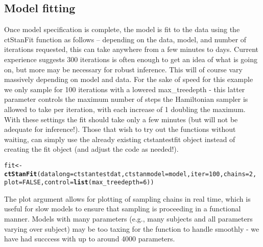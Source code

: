 \documentclass[nojss]{jss}\usepackage[]{graphicx}\usepackage[]{color}
\makeatletter
\newcommand{\hlnum}[1]{\textcolor[rgb]{0.686,0.059,0.569}{#1}}%
\newcommand{\hlstd}[1]{\textcolor[rgb]{0.345,0.345,0.345}{#1}}%
\newcommand{\hlkwb}[1]{\textcolor[rgb]{0.69,0.353,0.396}{#1}}%
\newcommand{\hlkwc}[1]{\textcolor[rgb]{0.333,0.667,0.333}{#1}}%
\newcommand{\hlkwd}[1]{\textcolor[rgb]{0.737,0.353,0.396}{\textbf{#1}}}%
\newenvironment{kframe}{%
 \def\at@end@of@kframe{}%
 \ifinner\ifhmode%
  \def\at@end@of@kframe{\end{minipage}}%
  \begin{minipage}{\columnwidth}%
 \fi\fi%
 \def\FrameCommand##1{\hskip\@totalleftmargin \hskip-\fboxsep
 \colorbox{shadecolor}{##1}\hskip-\fboxsep
     \hskip-\linewidth \hskip-\@totalleftmargin \hskip\columnwidth}%
 \MakeFramed {\advance\hsize-\width
   \@totalleftmargin\z@ \linewidth\hsize
   \@setminipage}}%
 {\par\unskip\endMakeFramed%
 \at@end@of@kframe}
\newenvironment{knitrout}{}{} %
\makeatother
\begin{document}
\subsection{Model fitting}
Once model specification is complete, the model is fit to the data using the ctStanFit function as follows -- depending on the data, model, and number of iterations requested, this can take anywhere from a few minutes to days. Current experience suggests 300 iterations is often enough to get an idea of what is going on, but more may be necessary for robust inference. This will of course vary massively depending on model and data. For the sake of speed for this example we only sample for 100 iterations with a lowered max\_treedepth - this latter parameter controls the maximum number of steps the Hamiltonian sampler is allowed to take per iteration, with each increase of 1 doubling the maximum. With these settings the fit should take only a few minutes (but will not be adequate for inference!). Those that wish to try out the functions without waiting, can simply use the already existing ctstantestfit object instead of creating the fit object (and adjust the code as needed!).

\begin{knitrout}\small
{}\color{fgcolor}\begin{kframe}
\begin{alltt}
\hlstd{fit}\hlkwb{<-}\hlkwd{ctStanFit}\hlstd{(}\hlkwc{datalong} \hlstd{= ctstantestdat,} \hlkwc{ctstanmodel} \hlstd{= model,} \hlkwc{iter}\hlstd{=}\hlnum{100}\hlstd{,} \hlkwc{chains}\hlstd{=}\hlnum{2}\hlstd{,}
  \hlkwc{plot}\hlstd{=}\hlnum{FALSE}\hlstd{,} \hlkwc{control}\hlstd{=}\hlkwd{list}\hlstd{(}\hlkwc{max_treedepth} \hlstd{=} \hlnum{6}\hlstd{))}
\end{alltt}
\end{kframe}
\end{knitrout}

The plot argument allows for plotting of sampling chains in real time, which is useful for slow models to ensure that sampling is proceeding in a functional manner. Models with many parameters (e.g., many subjects and all parameters varying over subject) may be too taxing for the function to handle smoothly - we have had succcess with up to around 4000 parameters.  
\end{document}

